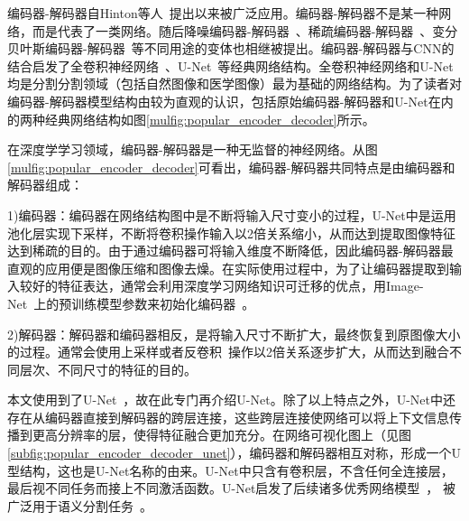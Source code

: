 编码器-解码器自Hinton等人~\cite{hinton2006reducing}提出以来被广泛应用。编码器-解码器不是某一种网络，而是代表了一类网络。随后降噪编码器-解码器~\cite{vincent2008extracting}、稀疏编码器-解码器~\cite{coates2011analysis}、变分贝叶斯编码器-解码器~\cite{kingma2013auto}等不同用途的变体也相继被提出。编码器-解码器与CNN的结合启发了全卷积神经网络~\cite{long2015fully}、U-Net~\cite{ronneberger2015u}等经典网络结构。全卷积神经网络和U-Net均是分割分割领域（包括自然图像和医学图像）最为基础的网络结构。为了读者对编码器-解码器模型结构由较为直观的认识，包括原始编码器-解码器和U-Net在内的两种经典网络结构如图\ref{mulfig:popular_encoder_decoder}所示。

在深度学学习领域，编码器-解码器是一种无监督的神经网络。从图\ref{mulfig:popular_encoder_decoder}可看出，编码器-解码器共同特点是由编码器和解码器组成：

1)编码器：编码器在网络结构图中是不断将输入尺寸变小的过程，U-Net中是运用池化层实现下采样，不断将卷积操作输入以2倍关系缩小，从而达到提取图像特征达到稀疏的目的。由于通过编码器可将输入维度不断降低，因此编码器-解码器最直观的应用便是图像压缩和图像去燥。在实际使用过程中，为了让编码器提取到输入较好的特征表达，通常会利用深度学习网络知识可迁移的优点，用Image-Net~\cite{deng2009imagenet}上的预训练模型参数来初始化编码器~\cite{iglovikov2018ternausnet}。

2)解码器：解码器和编码器相反，是将输入尺寸不断扩大，最终恢复到原图像大小的过程。通常会使用上采样或者反卷积~\cite{zeiler2010deconvolutional}操作以2倍关系逐步扩大，从而达到融合不同层次、不同尺寸的特征的目的。

本文使用到了U-Net~\cite{ronneberger2015u}，故在此专门再介绍U-Net。除了以上特点之外，U-Net中还存在从编码器直接到解码器的跨层连接，这些跨层连接使网络可以将上下文信息传播到更高分辨率的层，使得特征融合更加充分。在网络可视化图上（见图\ref{subfig:popular_encoder_decoder_unet}），编码器和解码器相互对称，形成一个U型结构，这也是U-Net名称的由来。U-Net中只含有卷积层，不含任何全连接层，最后视不同任务而接上不同激活函数。U-Net启发了后续诸多优秀网络模型~\cite{zhou2018unet++, oktay2018attention, alom2019recurrent}，
被广泛用于语义分割任务~\cite{cciccek20163d,dong2017automatic,li2018h}。

